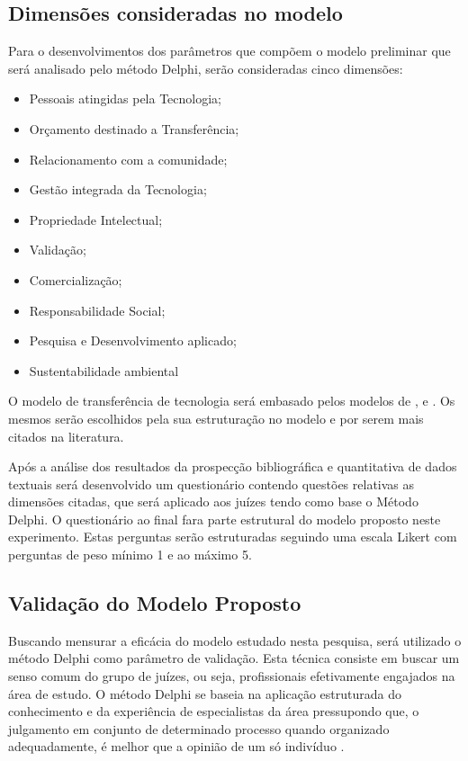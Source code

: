 \subsection{Dimensões consideradas no modelo}


Para o desenvolvimentos dos parâmetros que compõem o modelo preliminar que será analisado pelo método Delphi, serão consideradas cinco dimensões:

\begin{multicols}{2}
\centering
    \begin{itemize}
    \item{Pessoais atingidas pela Tecnologia;}
\item{Orçamento destinado a Transferência;}
\item{Relacionamento com a comunidade;}
\item{Gestão integrada da Tecnologia;}
\item{Propriedade Intelectual;}
\item{Validação;}
\item{Comercialização;}
\item{Responsabilidade Social;}
\item{Pesquisa e Desenvolvimento aplicado;}
\item{Sustentabilidade ambiental}
\end{itemize}
\end{multicols}


O modelo de transferência de tecnologia será embasado pelos modelos de ,  e . Os mesmos serão escolhidos pela sua estruturação no modelo e por serem mais citados na literatura.

Após a análise dos resultados da prospecção bibliográfica e  quantitativa de dados textuais será desenvolvido um questionário contendo questões relativas as dimensões citadas, que será aplicado aos juízes tendo como base o Método Delphi. O questionário ao final fara parte estrutural do modelo proposto neste experimento. Estas perguntas serão estruturadas seguindo uma escala Likert com perguntas de peso mínimo 1 e ao máximo 5. 


\subsection{Validação do Modelo Proposto}


Buscando mensurar a eficácia do modelo estudado nesta pesquisa, será utilizado o método Delphi como parâmetro de validação. Esta técnica consiste em buscar um senso comum do grupo de juízes, ou seja, profissionais efetivamente engajados na área de estudo. O método Delphi se baseia na aplicação estruturada do conhecimento e da experiência de especialistas da área pressupondo que, o julgamento em conjunto de determinado processo quando organizado adequadamente, é melhor que a opinião de um só indivíduo \cite{faro_tecnica_1997,santiago_matriz_2012}. 

